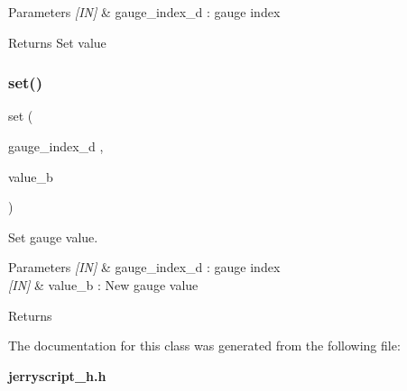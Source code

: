 \begin{DoxyParams}{Parameters}
{\em \mbox{[}\+I\+N\mbox{]}} & gauge\+\_\+index\+\_\+d \+: gauge index \\
\hline
\end{DoxyParams}
\begin{DoxyReturn}{Returns}
Set value 
\end{DoxyReturn}
\mbox{\label{classgauge_a42206ea1948d154d1aad15827ff5f427}} 
\subsubsection{set()}
{\footnotesize\ttfamily set (\begin{DoxyParamCaption}\item[{gauge\+\_\+index\+\_\+d}]{,  }\item[{value\+\_\+b}]{ }\end{DoxyParamCaption})}



Set gauge value. 


\begin{DoxyCode}{0}
\end{DoxyCode}



\begin{DoxyParams}{Parameters}
{\em \mbox{[}\+I\+N\mbox{]}} & gauge\+\_\+index\+\_\+d \+: gauge index \\
\hline
{\em \mbox{[}\+I\+N\mbox{]}} & value\+\_\+b \+: New gauge value \\
\hline
\end{DoxyParams}
\begin{DoxyReturn}{Returns}

\end{DoxyReturn}


The documentation for this class was generated from the following file\+:\begin{DoxyCompactItemize}
\item 
\textbf{ jerryscript\+\_\+h.\+h}\end{DoxyCompactItemize}
